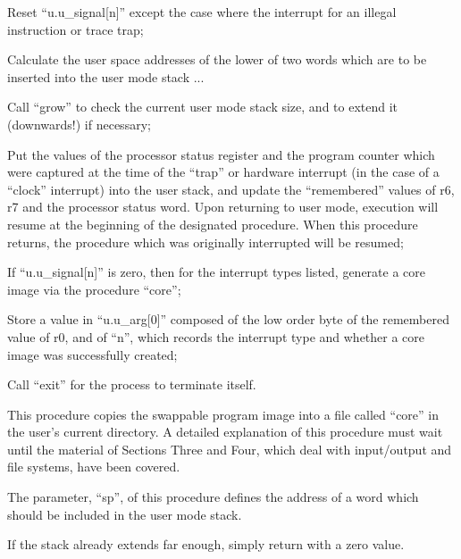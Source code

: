 \bd
\item[4054:] Reset ``u.u\_signal[n]'' except
the case where the interrupt
for an illegal instruction or
trace trap;

\item[4055:] Calculate the user space
 addresses of the lower of two
 words which are to be inserted
 into the user mode stack ...

\item[4056:] Call ``grow'' to check the current
 user mode stack size, and to
 extend it (downwards!) if necessary;

\item[4057:] Put the values of the processor
 status register and the program
 counter which were captured at
 the time of the ``trap'' or
 hardware interrupt (in the case
 of a ``clock'' interrupt) into the
 user stack, and update the
 ``remembered'' values of r6, r7 and
 the processor status word. Upon
 returning to user mode, execution
 will resume at the beginning of
 the designated procedure. When
 this procedure returns, the procedure which was originally
 interrupted will be resumed;

\item[4066:] If ``u.u\_signal[n]'' is zero, then
 for the interrupt types listed,
 generate a core image via the
 procedure ``core'';

\item[4079:] Store a value in ``u.u\_arg[0]''
 composed of the low order byte of
 the remembered value of r0, and
 of ``n'', which records the interrupt type and whether a core
 image was successfully created;

\item[4080:] Call ``exit'' for the process
to terminate itself.
\ed



This procedure copies the swappable
program image into a file called ``core''
in the user's current directory. A
detailed explanation of this procedure
must wait until the material of Sections Three and Four, which deal with
input/output and file systems, have
been covered.



The parameter, ``sp'', of this procedure
defines the address of a word which
should be included in the user mode
stack.

\bd
\item[4141:] If the stack already extends far
 enough, simply return with a zero
 value.

